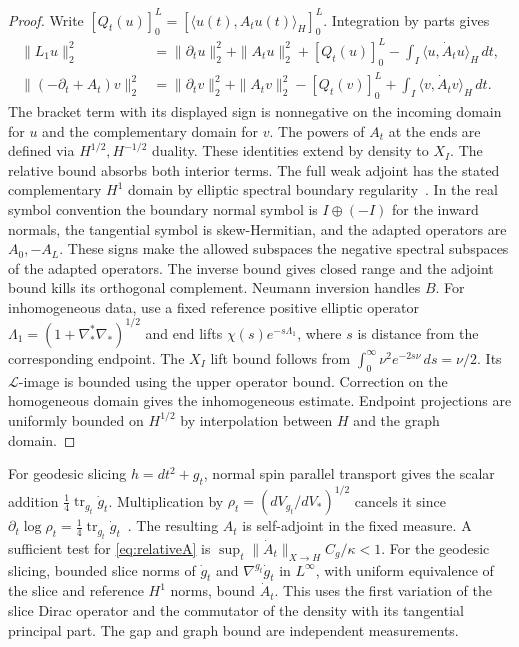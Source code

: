 \documentclass[11pt]{article}
\theoremstyle{remark}
\newcommand{\ip}[2]{\langle #1,#2\rangle}
\newcommand{\Tr}{\operatorname{tr}}
\begin{document}
\begin{proof}
Write \([Q_t(u)]_0^L=[\ip{u(t)}{A_tu(t)}_H]_0^L\). Integration by parts gives
\begin{align*}
 \|L_1u\|_2^2
   &=\|\partial_tu\|_2^2+\|A_tu\|_2^2+[Q_t(u)]_0^L
                                    -\int_I\ip{u}{\dot A_tu}_H\,dt,\\
 \|(-\partial_t+A_t)v\|_2^2
   &=\|\partial_tv\|_2^2+\|A_tv\|_2^2-[Q_t(v)]_0^L
                                    +\int_I\ip{v}{\dot A_tv}_H\,dt .
\end{align*}
The bracket term with its displayed sign is nonnegative on the incoming domain for \(u\) and the complementary domain for \(v\). The powers of \(A_t\) at the ends are defined via \(H^{1/2},H^{-1/2}\) duality. These identities extend by density to \(X_I\). The relative bound absorbs both interior terms. The full weak adjoint has the stated complementary \(H^1\) domain by elliptic spectral boundary regularity~\cite[Theorems~1.7 and 1.12, Addendum~1.13, Example~1.16(a), and \S7.2]{BaerBallmann2011Boundary}. In the real symbol convention the boundary normal symbol is \(I\oplus(-I)\) for the inward normals, the tangential symbol is skew-Hermitian, and the adapted operators are \(A_0,-A_L\). These signs make the allowed subspaces the negative spectral subspaces of the adapted operators. The inverse bound gives closed range and the adjoint bound kills its orthogonal complement. Neumann inversion handles \(B\). For inhomogeneous data, use a fixed reference positive elliptic operator \(\Lambda_1=(1+\nabla_*^*\nabla_*)^{1/2}\) and end lifts \(\chi(s)e^{-s\Lambda_1}\), where \(s\) is distance from the corresponding endpoint. The \(X_I\) lift bound follows from \(\int_0^\infty \nu^2e^{-2s\nu}\,ds=\nu/2\). Its \(\mathcal L\)-image is bounded using the upper operator bound. Correction on the homogeneous domain gives the inhomogeneous estimate. Endpoint projections are uniformly bounded on \(H^{1/2}\) by interpolation between \(H\) and the graph domain.
\end{proof}

For geodesic slicing \(h=dt^2+g_t\), normal spin parallel transport gives the scalar addition \(\tfrac14\Tr_{g_t}\dot g_t\). Multiplication by \(\rho_t=(dV_{g_t}/dV_*)^{1/2}\) cancels it since \(\partial_t\log\rho_t=\tfrac14\Tr_{g_t}\dot g_t\)~\cite[(3.6), (4.1), and Theorem~5.1]{BaerGauduchonMoroianu2005Cylinders}. The resulting \(A_t\) is self-adjoint in the fixed measure. A sufficient test for \eqref{eq:relativeA} is
\(\sup_t\|\dot A_t\|_{X\to H} C_g/\kappa<1\).
For the geodesic slicing, bounded slice norms of \(\dot g_t\) and \(\nabla^{g_t}\dot g_t\) in \(L^\infty\), with uniform equivalence of the slice and reference \(H^1\) norms, bound \(\dot A_t\). This uses the first variation of the slice Dirac operator and the commutator of the density with its tangential principal part. The gap and graph bound are independent measurements.
\end{document}
